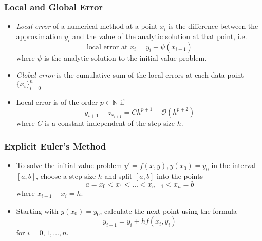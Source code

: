 \documentclass[11pt, a4paper]{article}
\begin{document}
\subsubsection{Local and Global Error}
\begin{itemize}
	\item \textit{Local error} of a numerical method at a point $ x_{i} $ is the difference between the approximation $ y_{i} $ and the value of the analytic solution at that point, i.e.
	\begin{equation*}
		\text{local error at } x_{i} = y_{i} - \psi(x_{i+1})
	\end{equation*}
	where $ \psi $ is the analytic solution to the initial value problem.

	\item \textit{Global error} is the cumulative sum of the local errors at each data point $ \{x_{i}\}_{i=0}^{n} $
	
	\item Local error is of the order $ p \in \mathbb{N} $ if
	\begin{equation*}
		y_{i+1} - z_{x_{i+1}} = C h^{p+1} + \mathcal{O}(h^{p+2})
	\end{equation*}
	where $ C $ is a constant independent of the step size $ h $.
\end{itemize}


\subsubsection{Explicit Euler's Method}
\begin{itemize}
	\item To solve the initial value problem $ y' = f(x, y),  y(x_{0}) = y_{0} $ in the interval $ [a, b] $, choose a step size $ h $ and split $ [a, b] $ into the points
	\begin{equation*}
		a = x_0 < x_1 < \dots < x_{n-1} < x_{n} = b
	\end{equation*}
	where $ x_{i+1} - x_{i} = h$.
	
	\item Starting with $ y(x_{0}) = y_{0}$, calculate the next point using the formula
	\begin{equation*}
		y_{i+1} = y_{i} + hf(x_i, y_i) 
	\end{equation*}
	for $ i = 0, 1, \ldots, n $.
\end{itemize}
\end{document}
